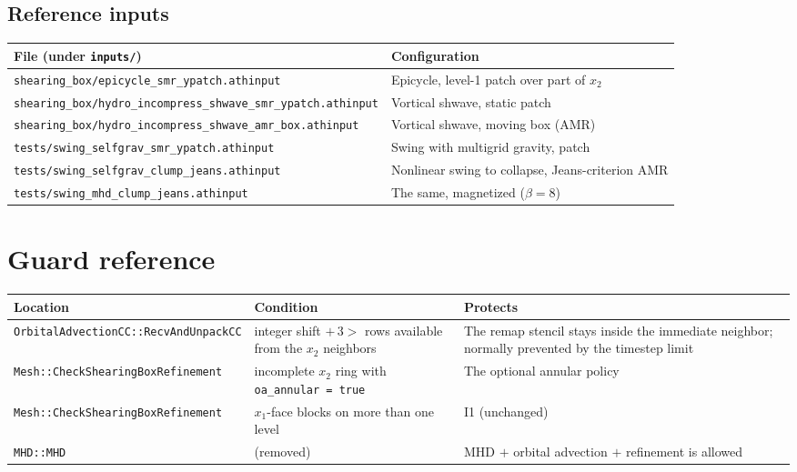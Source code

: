 \documentclass[11pt]{article}
\newcommand{\code}[1]{\texttt{#1}}
\newcommand{\file}[1]{\texttt{\small #1}}
\newcommand{\fn}[1]{\texttt{\small #1}}
\begin{document}
\subsection{Reference inputs}
\begin{center}
\small
\begin{tabular}{@{}>{\raggedright\arraybackslash}p{8.6cm}p{5.8cm}@{}}
\toprule
File (under \file{inputs/}) & Configuration \\
\midrule
\file{shearing\_box/epicycle\_smr\_ypatch.athinput} & Epicycle, level-1 patch over
  part of $x_2$ \\
\file{shearing\_box/hydro\_incompress\_shwave\_smr\_ypatch.athinput} & Vortical shwave,
  static patch \\
\file{shearing\_box/hydro\_incompress\_shwave\_amr\_box.athinput} & Vortical shwave,
  moving box (AMR) \\
\file{tests/swing\_selfgrav\_smr\_ypatch.athinput} & Swing with multigrid gravity, patch \\
\file{tests/swing\_selfgrav\_clump\_jeans.athinput} & Nonlinear swing to collapse,
  Jeans-criterion AMR \\
\file{tests/swing\_mhd\_clump\_jeans.athinput} & The same, magnetized ($\beta = 8$) \\
\bottomrule
\end{tabular}
\end{center}

\section{Guard reference}
\label{sec:guards}
\begin{center}
\small
\begin{tabular}{@{}>{\raggedright\arraybackslash}p{4.4cm}>{\raggedright\arraybackslash}p{4.4cm}p{5.4cm}@{}}
\toprule
Location & Condition & Protects \\
\midrule
\fn{OrbitalAdvectionCC::\-RecvAndUnpackCC} & integer shift $+\,3 >$ rows available from
  the $x_2$ neighbors & The remap stencil stays inside the immediate neighbor; normally
  prevented by the timestep limit \\
\fn{Mesh::CheckShearingBox\-Refinement} & incomplete $x_2$ ring with
  \code{oa\_annular = true} & The optional annular policy \\
\fn{Mesh::CheckShearingBox\-Refinement} & $x_1$-face blocks on more than one level & I1
  (unchanged) \\
\fn{MHD::MHD} & (removed) & MHD $+$ orbital advection $+$ refinement is allowed \\
\bottomrule
\end{tabular}
\end{center}
\end{document}
